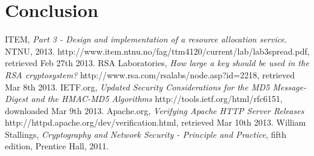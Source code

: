 \documentclass[a4paper,11pt]{article}
\begin{document}
\section*{Conclusion}
\begin{thebibliography}{9}
ITEM, 
	\emph{Part 3 - Design and implementation of a resource allocation service}.
	NTNU, 2013.  http://www.item.ntnu.no/fag/ttm4120/current/lab/lab3spread.pdf, retrieved Feb 27th 2013.
RSA Laboratories, \emph{How large a key should be used in the RSA cryptosystem?} http://www.rsa.com/rsalabs/node.asp?id=2218, retrieved Mar 8th 2013.	
IETF.org, \emph{Updated Security Considerations for the MD5 Message-Digest and the HMAC-MD5 Algorithms} http://tools.ietf.org/html/rfc6151, downloaded Mar 9th 2013.
 Apache.org, \emph{Verifying Apache HTTP Server Releases} http://httpd.apache.org/dev/verification.html, retrieved Mar 10th 2013.
William Stallings, \emph{Cryptography and Network Security - Principle and Practice}, fifth edition, Prentice Hall, 2011.
\end{thebibliography}
\listoffigures
\end{document}
